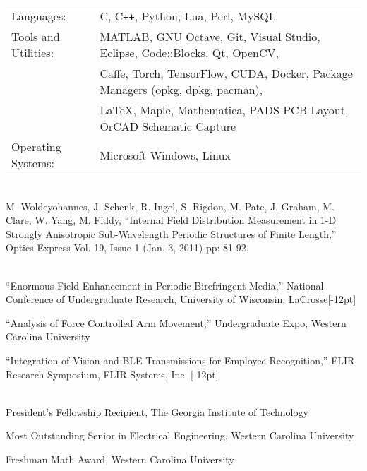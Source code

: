 \documentclass[14pt,letterpaper]{extarticle}
\begin{document}
\medskip\noindent
\begin{tabularx}{\linewidth}{@{}lL@{}}
\footnotesize{Languages:} & \footnotesize{C, C\texttt{++}, Python, Lua, Perl, MySQL}\vspace{0.5mm}\\
\footnotesize{Tools and Utilities:} & \footnotesize{MATLAB, GNU Octave, Git, Visual Studio, Eclipse, Code::Blocks, Qt, OpenCV,}\\
                                    & \footnotesize{Caffe, Torch, TensorFlow, CUDA, Docker, Package Managers (opkg, dpkg, pacman),}\\
                                    & \footnotesize{\LaTeX, Maple, Mathematica, PADS PCB Layout, OrCAD Schematic Capture}\vspace{0.5mm}\\
\footnotesize{Operating Systems:}   & \footnotesize{Microsoft Windows, Linux}\\
\end{tabularx}

\vspace{5.3pt}\\
\noindent
\footnotesize{M. Woldeyohannes, J. Schenk, R. Ingel, S. Rigdon, M. Pate, J. Graham, M. Clare, W. Yang, M. Fiddy, ``Internal Field Distribution Measurement in 1-D Strongly Anisotropic Sub-Wavelength Periodic Structures of Finite Length,'' Optics Express Vol. 19, Issue 1 (Jan. 3, 2011) pp: 81-92.}

\vspace{5.3pt}\\
\footnotesize{``Enormous  Field  Enhancement  in  Periodic  Birefringent Media,''
National Conference of Undergraduate Research, University of Wisconsin, LaCrosse}[-12pt]

\medskip\noindent
\footnotesize{``Analysis of Force Controlled Arm Movement,'' Undergraduate Expo, Western Carolina University}

\medskip\noindent
\footnotesize{``Integration of Vision and BLE Transmissions for Employee Recognition,'' FLIR Research Symposium, FLIR Systems, Inc.}
[-12pt]

\vspace{5.3pt}\\
\noindent\footnotesize{President's Fellowship Recipient, The Georgia Institute of Technology}

\medskip
\noindent\footnotesize{Most Outstanding Senior in Electrical Engineering, Western Carolina University}

\medskip
\noindent\footnotesize{Freshman Math Award, Western Carolina University}
\end{document}
